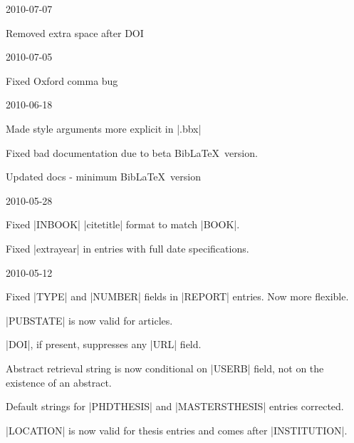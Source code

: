 \documentclass{ltxdockit}
\begin{document}
\begin{changelog}



\begin{release}{1.4}{2010-07-07}
\item Removed extra space after DOI
\end{release}

\begin{release}{1.3}{2010-07-05}
\item Fixed Oxford comma bug
\end{release}

\begin{release}{1.2}{2010-06-18}
\item Made style arguments more explicit in |.bbx|
\item Fixed bad documentation due to beta Bib\LaTeX\ version.
\item Updated docs - minimum Bib\LaTeX\ version
\end{release}

\begin{release}{1.1}{2010-05-28}
\item Fixed |INBOOK| |citetitle| format to match |BOOK|.
\item Fixed |extrayear| in entries with full date specifications.
\end{release}

\begin{release}{1.0}{2010-05-12}
\item Fixed |TYPE| and |NUMBER| fields in |REPORT| entries. Now more
  flexible.
\item |PUBSTATE| is now valid for articles.
\item |DOI|, if present, suppresses any |URL| field.
\item Abstract retrieval string is now conditional on |USERB| field, not on
  the existence of an abstract.
\item Default strings for |PHDTHESIS| and |MASTERSTHESIS| entries corrected.
\item |LOCATION| is now valid for thesis entries and comes after |INSTITUTION|.
\end{release}


\end{changelog}
\end{document}
